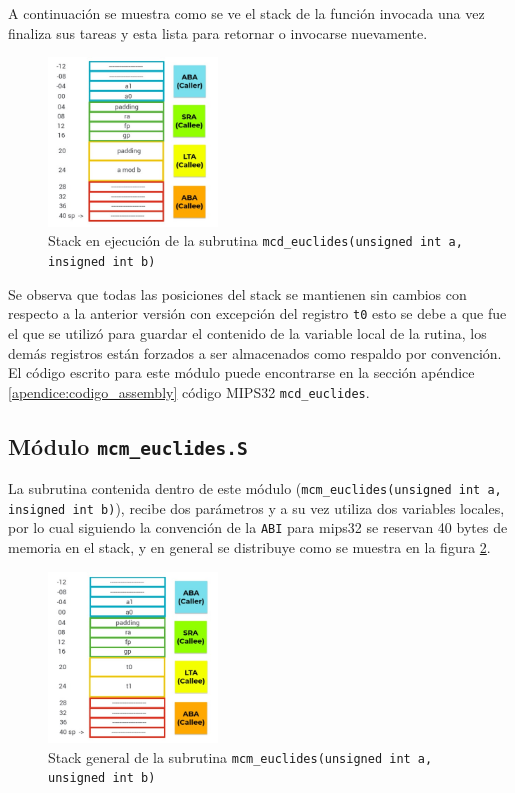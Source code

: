 \documentclass[titlepage,a4paper]{article}
\begin{document}
A continuación se muestra como se ve el stack de la función invocada una vez finaliza sus tareas y esta lista para retornar o invocarse nuevamente.\\

\begin{figure}[H]
\centering
\includegraphics[width=0.4\textwidth]{images/stackMcdEjec.jpeg}
\cprotect\caption{\label{fig:seq02}Stack en ejecución de la subrutina \verb|mcd_euclides(unsigned int a, insigned int b)|}
\end{figure}
	
Se observa que todas las posiciones del stack se mantienen sin cambios con respecto a la anterior versión con excepción del registro \verb|t0| esto se debe a que fue el que se utilizó para guardar el contenido de la variable local de la rutina, los demás registros están forzados a ser almacenados como respaldo por convención.\\

El código escrito para este módulo puede encontrarse en la sección apéndice \ref{apendice:codigo_assembly} código MIPS32 \verb|mcd_euclides|.

\cprotect\subsection{Módulo \verb|mcm_euclides.S|}
La subrutina contenida dentro de este módulo (\verb|mcm_euclides(unsigned int a, insigned int b)|), recibe dos parámetros y a su vez utiliza dos variables locales, por lo cual siguiendo la convención de la \verb|ABI| para mips32 se reservan 40 bytes de memoria en el stack, y en general se distribuye como se muestra en la figura \ref{fig:seq03}.\\

\begin{figure}[H]
\centering
\includegraphics[width=0.4\textwidth]{images/stackMcmCall.jpeg}
\cprotect\caption{\label{fig:seq03}Stack general de la subrutina \verb|mcm_euclides(unsigned int a, unsigned int b)|}
\end{figure}
\end{document}
